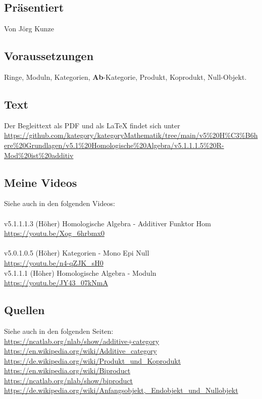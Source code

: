 \documentclass[a4paper]{amsart}
\theoremstyle{definition}
\begin{document}
\subsection*{Präsentiert}
Von Jörg Kunze

\subsection*{Voraussetzungen}
Ringe, Moduln, Kategorien, \textbf{Ab}-Kategorie, Produkt, Koprodukt, Null-Objekt.

\subsection*{Text}
Der Begleittext als PDF und als LaTeX findet sich unter
{\tiny
   \url{https://github.com/kategory/kategoryMathematik/tree/main/v5%20H%C3%B6here%20Grundlagen/v5.1%20Homologische%20Algebra/v5.1.1.1.5%20R-Mod%20ist%20additiv}
}

\subsection*{Meine Videos}
Siehe auch in den folgenden Videos:\\
\\
v5.1.1.1.3 (Höher) Homologische Algebra - Additiver Funktor Hom\\
\url{https://youtu.be/Xog_6hrbmx0}\\
\\
v5.0.1.0.5 (Höher) Kategorien - Mono Epi Null\\
\url{https://youtu.be/n4-qZJK_sH0}
\\
v5.1.1.1 (Höher) Homologische Algebra - Moduln\\
\url{https://youtu.be/JY43_07kNmA}\\

\subsection*{Quellen}
Siehe auch in den folgenden Seiten:\\
\url{https://ncatlab.org/nlab/show/additive+category}\\
\url{https://en.wikipedia.org/wiki/Additive_category}\\
\url{https://de.wikipedia.org/wiki/Produkt_und_Koprodukt}\\
\url{https://en.wikipedia.org/wiki/Biproduct}\\
\url{https://ncatlab.org/nlab/show/biproduct}\\
\url{https://de.wikipedia.org/wiki/Anfangsobjekt,_Endobjekt_und_Nullobjekt}
\end{document}
